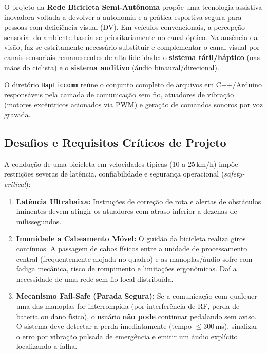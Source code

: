\documentclass[12pt,a4paper]{article}
\begin{document}
O projeto da \textbf{Rede Bicicleta Semi-Autônoma} propõe uma tecnologia assistiva inovadora voltada a devolver a autonomia e a prática esportiva segura para pessoas com deficiência visual (DV). Em veículos convencionais, a percepção sensorial do ambiente baseia-se prioritariamente no canal óptico. Na ausência da visão, faz-se estritamente necessário substituir e complementar o canal visual por canais sensoriais remanescentes de alta fidelidade: o \textbf{sistema tátil/háptico} (nas mãos do ciclista) e o \textbf{sistema auditivo} (áudio binaural/direcional).

O diretório \texttt{Hapticcomm} reúne o conjunto completo de arquivos em C++/Arduino responsáveis pela camada de comunicação sem fio, atuadores de vibração (motores excêntricos acionados via PWM) e geração de comandos sonoros por voz gravada.

\subsection{Desafios e Requisitos Críticos de Projeto}
A condução de uma bicicleta em velocidades típicas (10 a 25\,km/h) impõe restrições severas de latência, confiabilidade e segurança operacional (\textit{safety-critical}):
\begin{enumerate}
    \item \textbf{Latência Ultrabaixa:} Instruções de correção de rota e alertas de obstáculos iminentes devem atingir os atuadores com atraso inferior a dezenas de milissegundos.
    \item \textbf{Imunidade a Cabeamento Móvel:} O guidão da bicicleta realiza giros contínuos. A passagem de cabos físicos entre a unidade de processamento central (frequentemente alojada no quadro) e as manoplas/áudio sofre com fadiga mecânica, risco de rompimento e limitações ergonômicas. Daí a necessidade de uma rede sem fio local distribuída.
    \item \textbf{Mecanismo Fail-Safe (Parada Segura):} Se a comunicação com qualquer uma das manoplas for interrompida (por interferência de RF, perda de bateria ou dano físico), o usuário \textbf{não pode} continuar pedalando sem aviso. O sistema deve detectar a perda imediatamente (tempo $\le 300$\,ms), sinalizar o erro por vibração pulsada de emergência e emitir um áudio explícito localizando a falha.
\end{enumerate}
\end{document}
